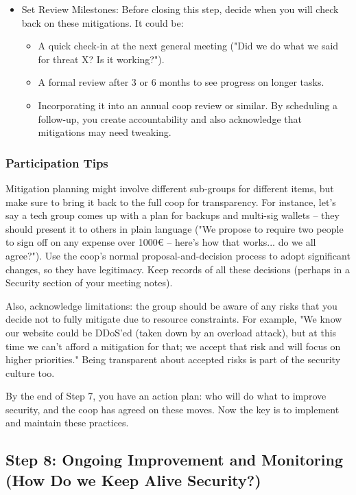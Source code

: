 \begin{itemize}
    \item Set Review Milestones: Before closing this step, decide when you will check back on these mitigations.
    It could be:
        \begin{itemize}   
            \item A quick check-in at the next general meeting ("Did we do what we said for threat X? Is it
    working?").
            \item A formal review after 3 or 6 months to see progress on longer tasks.
            \item Incorporating it into an annual coop review or similar. By scheduling a follow-up, you create
    accountability and also acknowledge that mitigations may need tweaking.
        \end{itemize}
    
    \end{itemize}
    
\subsubsection{Participation Tips}

Mitigation planning might involve different sub-groups for different items, but
make sure to bring it back to the full coop for transparency. For instance,
let's say a tech group comes up with a plan for backups and multi-sig wallets –
they should present it to others in plain language ("We propose to require two
people to sign off on any expense over 1000€ – here's how that works... do we
all agree?"). Use the coop's normal proposal-and-decision process to adopt
significant changes, so they have legitimacy. Keep records of all these
decisions (perhaps in a Security section of your meeting notes).

Also, acknowledge limitations: the group should be aware of any risks that you
decide not to fully mitigate due to resource constraints. For example, "We know
our website could be DDoS'ed (taken down by an overload attack), but at this
time we can't afford a mitigation for that; we accept that risk and will focus
on higher priorities." Being transparent about accepted risks is part of the
security culture too.

By the end of Step 7, you have an action plan: who will do what to improve
security, and the coop has agreed on these moves. Now the key is to implement
and maintain these practices.


\subsection{Step 8: Ongoing Improvement and Monitoring (How Do we Keep Alive Security?)}
\label{subsec:Step8}

